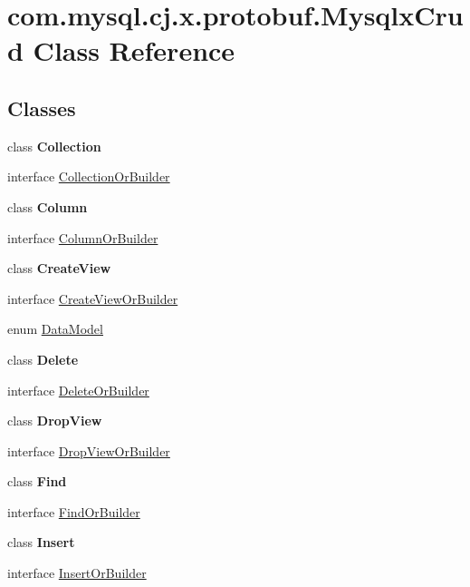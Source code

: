 \hypertarget{classcom_1_1mysql_1_1cj_1_1x_1_1protobuf_1_1_mysqlx_crud}{}\section{com.\+mysql.\+cj.\+x.\+protobuf.\+Mysqlx\+Crud Class Reference}
\label{classcom_1_1mysql_1_1cj_1_1x_1_1protobuf_1_1_mysqlx_crud}
\subsection*{Classes}
\begin{DoxyCompactItemize}
\item 
class {\bfseries Collection}
\item 
interface \mbox{\hyperlink{interfacecom_1_1mysql_1_1cj_1_1x_1_1protobuf_1_1_mysqlx_crud_1_1_collection_or_builder}{Collection\+Or\+Builder}}
\item 
class {\bfseries Column}
\item 
interface \mbox{\hyperlink{interfacecom_1_1mysql_1_1cj_1_1x_1_1protobuf_1_1_mysqlx_crud_1_1_column_or_builder}{Column\+Or\+Builder}}
\item 
class {\bfseries Create\+View}
\item 
interface \mbox{\hyperlink{interfacecom_1_1mysql_1_1cj_1_1x_1_1protobuf_1_1_mysqlx_crud_1_1_create_view_or_builder}{Create\+View\+Or\+Builder}}
\item 
enum \mbox{\hyperlink{enumcom_1_1mysql_1_1cj_1_1x_1_1protobuf_1_1_mysqlx_crud_1_1_data_model}{Data\+Model}}
\item 
class {\bfseries Delete}
\item 
interface \mbox{\hyperlink{interfacecom_1_1mysql_1_1cj_1_1x_1_1protobuf_1_1_mysqlx_crud_1_1_delete_or_builder}{Delete\+Or\+Builder}}
\item 
class {\bfseries Drop\+View}
\item 
interface \mbox{\hyperlink{interfacecom_1_1mysql_1_1cj_1_1x_1_1protobuf_1_1_mysqlx_crud_1_1_drop_view_or_builder}{Drop\+View\+Or\+Builder}}
\item 
class {\bfseries Find}
\item 
interface \mbox{\hyperlink{interfacecom_1_1mysql_1_1cj_1_1x_1_1protobuf_1_1_mysqlx_crud_1_1_find_or_builder}{Find\+Or\+Builder}}
\item 
class {\bfseries Insert}
\item 
interface \mbox{\hyperlink{interfacecom_1_1mysql_1_1cj_1_1x_1_1protobuf_1_1_mysqlx_crud_1_1_insert_or_builder}{Insert\+Or\+Builder}}

\end{DoxyCompactItemize}
